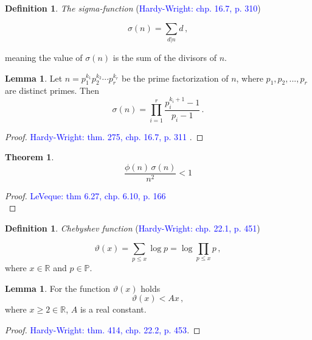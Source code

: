 \documentclass{article}
\theoremstyle{definition}
\newtheorem{definition}[subsection]{Definition}
\newtheorem{lemma}[subsection]{Lemma}
\newtheorem{theorem}[subsection]{Theorem}
\begin{document}
\begin{definition}{\emph{The sigma-function} (\textcolor{blue}{Hardy-Wright: chp. 16.7, p. 310})}

\begin{equation*}
    \sigma(n)=\sum_{d\vert n} d\,,
\end{equation*}

meaning the value of $\sigma(n)$ is the sum of the divisors of $n$.
\end{definition}

\begin{lemma}
\label{lemma:sigma}
Let $n=p_1^{k_1}p_2^{k_2}\cdots p_r^{k_r}$ be the prime factorization of $n$, where $p_1,p_2,...,p_r$ are distinct primes. Then
\begin{equation*}
    \sigma(n)=\prod_{i=1}^r \frac{p_i^{k_i+1}-1}{p_i-1}\,.
\end{equation*}

\begin{proof}
\textcolor{blue}{Hardy-Wright: thm. 275, chp. 16.7, p. 311 }.
\end{proof}
\end{lemma}

\begin{theorem}
\label{thm:sigmafii}
\begin{equation*}
    \frac{\phi(n)\,\sigma(n)}{n^2}<1
\end{equation*}

\begin{proof}
\textcolor{blue}{LeVeque: thm 6.27, chp. 6.10, p. 166}\\
\end{proof}
\end{theorem}


\begin{definition}{\emph{Chebyshev function} (\textcolor{blue}{Hardy-Wright: chp. 22.1, p. 451})}

\begin{equation*}
    \vartheta(x)=\sum_{p\leq x} \log p = \log \prod_{p\leq x} p\,,
\end{equation*}
where $x\in\mathbb{R}$ and $p\in\mathbb{P}$.

\end{definition}

\begin{lemma}
\label{lemma:vartheta}
For the function $\vartheta(x)$ holds
\begin{equation*}
    \vartheta(x) < Ax\,,
\end{equation*}
where $x\geq2\in\mathbb{R}$, $A$ is a real constant.

\begin{proof}
\textcolor{blue}{Hardy-Wright: thm. 414, chp. 22.2, p. 453}.
\end{proof}
\end{lemma}
\end{document}
